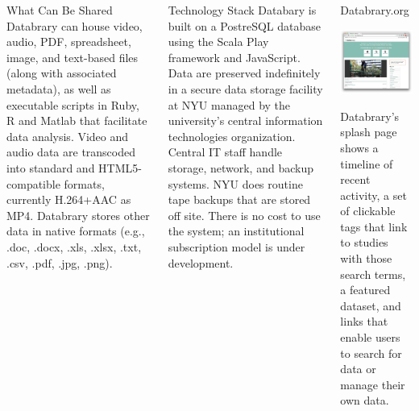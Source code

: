 \documentclass[final]{beamer}
\begin{document}
\begin{frame}{}
\begin{columns}[t]
\begin{block}{What Can Be Shared}
			Databrary can house video, audio, PDF, spreadsheet, image, and text-based files (along with associated metadata), as well as executable scripts in Ruby, R and Matlab that facilitate data analysis.
			Video and audio data are transcoded into standard and HTML5-compatible formats, currently H.264+AAC as MP4. Databrary stores other data in native formats (e.g., .doc, .docx, .xls, .xlsx, .txt, .csv, .pdf, .jpg, .png).
		\end{block}
		\begin{block}{Technology Stack}
			Databary is built on a PostreSQL database using the Scala Play framework and JavaScript.
			Data are preserved indefinitely in a secure data storage facility at NYU managed by the university's central information technologies organization. Central IT staff handle storage, network, and backup systems. NYU does routine tape backups that are stored off site. There is no cost to use the system; an institutional subscription model is under development.
		\end{block}
		\begin{block}{Databrary.org}
			\begin{center}
				\includegraphics[width=\textwidth]{img/databrary-splash.png}
			\end{center}
			Databrary's splash page shows a timeline of recent activity, a set of clickable tags that link to studies with those search terms, a featured dataset, and links that enable users to search for data or manage their own data.

\end{block}
\end{columns}
\end{frame}
\end{document}
